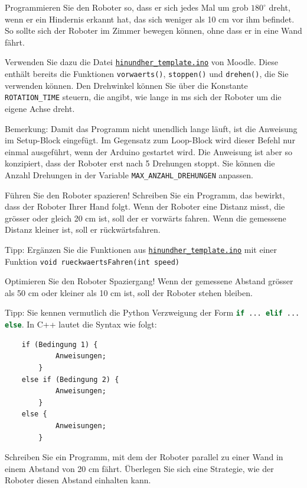 \begin{myexercise}
    Programmieren Sie den Roboter so, dass er sich jedes Mal um grob \(180^\circ\) dreht, wenn er ein Hindernis erkannt hat, das sich weniger als 10 cm vor ihm befindet. So sollte sich der Roboter im Zimmer bewegen können, ohne dass er in eine Wand fährt.

    Verwenden Sie dazu die Datei \hyperref[lst:hinundher-template]{\texttt{hinundher\_template.ino}} von Moodle. Diese enthält bereits die Funktionen \lstinline|vorwaerts()|, \lstinline|stoppen()| und \lstinline|drehen()|, die Sie verwenden können. Den Drehwinkel können Sie über die Konstante \lstinline|ROTATION_TIME| steuern, die angibt, wie lange in \unit{\milli\second} sich der Roboter um die eigene Achse dreht.

    Bemerkung: \newline
    Damit das Programm nicht unendlich lange läuft, ist die Anweisung im Setup-Block eingefügt. Im Gegensatz zum Loop-Block wird dieser Befehl nur einmal ausgeführt, wenn der Arduino gestartet wird. Die Anweisung ist aber so konzipiert, dass der Roboter erst nach 5 Drehungen stoppt. Sie können die Anzahl Drehungen in der Variable \lstinline|MAX_ANZAHL_DREHUNGEN| anpassen.

\end{myexercise}

\begin{myexercise}
    Führen Sie den Roboter spazieren!\newline
    Schreiben Sie ein Programm, das bewirkt, dass der Roboter Ihrer Hand folgt. Wenn der Roboter eine Distanz misst, die grösser oder gleich 20 \unit{\centi\metre} ist, soll der er vorwärts fahren. Wenn die gemessene Distanz kleiner ist, soll er rückwärtsfahren.

    Tipp: Ergänzen Sie die Funktionen aus \hyperref[lst:hinundher-template]{\texttt{hinundher\_template.ino}} mit einer Funktion \lstinline|void rueckwaertsFahren(int speed)|
\end{myexercise}
\begin{myexercise}
    Optimieren Sie den Roboter Spaziergang! \newline
    Wenn der gemessene Abstand grösser als 50 \unit{\centi\metre} oder kleiner als 10  \unit{\centi\metre} ist, soll der Roboter stehen bleiben.

    Tipp: Sie kennen vermutlich die Python Verzweigung der Form \lstinline[language=Python]|if ... elif ... else|. In C++ lautet die Syntax wie folgt:
    \begin{lstlisting}
    if (Bedingung 1) {
            Anweisungen;
        }
    else if (Bedingung 2) {
            Anweisungen;
        }
    else {
            Anweisungen;
        }
     \end{lstlisting}

\end{myexercise}
\begin{myexercise}
    Schreiben Sie ein Programm, mit dem der Roboter parallel zu einer Wand in einem Abstand von  20 \unit{\centi\metre} fährt. Überlegen Sie sich eine Strategie, wie der Roboter diesen Abstand einhalten kann.
\end{myexercise}

